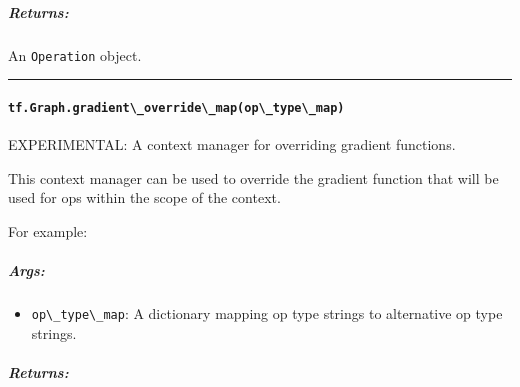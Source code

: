 \subparagraph{Returns: }\label{returns-12}

An \lstinline{Operation} object.

\begin{center}\rule{0.5\linewidth}{\linethickness}\end{center}

\paragraph{\texorpdfstring{\lstinline{tf.Graph.gradient\_override\_map(op\_type\_map)}
}{tf.Graph.gradient\_override\_map(op\_type\_map) }}\label{tf.graph.gradientux5foverrideux5fmapopux5ftypeux5fmap}

EXPERIMENTAL: A context manager for overriding gradient functions.

This context manager can be used to override the gradient function that
will be used for ops within the scope of the context.

For example:

\begin{Shaded}
\begin{Highlighting}[]
\NormalTok{(}\NormalTok{)}
 

  
  \OperatorTok{=} \NormalTok{)}
  \OperatorTok{=} 
   \NormalTok{: }\NormalTok{\}):}
    \OperatorTok{=} 
\end{Highlighting}
\end{Shaded}

\subparagraph{Args: }\label{args-11}

\begin{itemize}
\tightlist
\item
  \lstinline{op\_type\_map}: A dictionary mapping op type strings to
  alternative op type strings.
\end{itemize}

\subparagraph{Returns: }\label{returns-13}


